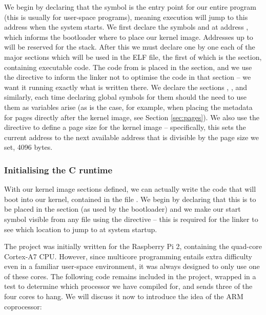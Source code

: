         We begin by declaring that the symbol  is the entry point
        for our entire program (this is usually  for user-space
        programs), meaning execution will jump to this address when the system
        starts. We first declare the symbols  and
         at address , which informs the
        bootloader where to place our kernel image. Addresses up to
         will be reserved for the stack. After this we must declare
        one by one each of the major sections which will be used in the ELF
        file, the first of which is the  section, containing
        executable code.  The code from  is placed in the
         section, and we use the  directive to
        inform the linker not to optimise the code in that section -- we want it
        running exactly what is written there. We declare the sections
        , , and  similarly, each time
        declaring global symbols for them should the need to use them as
        variables arise (as is the case, for example, when placing the metadata
        for pages directly after the kernel image, see Section \ref{sec:pages}).
        We also use the directive  to define a page size for the
        kernel image -- specifically, this sets the current address to the next
        available address that is divisible by the page size we set, 4096 bytes.

    \subsubsection{Initialising the C runtime}
        With our kernel image sections defined, we can actually write the code
        that will boot into our kernel, contained in the file . We
        begin by declaring that this is to be placed in the 
        section (as used by the bootloader) and we make our start symbol visible
        from any file using the  directive -- this is required for
        the linker to see which location to jump to at system startup.

        The project was initially written for the Raspberry Pi 2, containing the
        quad-core Cortex-A7 CPU. However, since multicore programming entails
        extra difficulty even in a familiar user-space environment, it was
        always designed to only use one of these cores. The following code
        remains included in the project, wrapped in a test to determine which
        processor we have compiled for, and sends three of the four cores to
        hang. We will discuss it now to introduce the idea of the ARM
        coprocessor:

